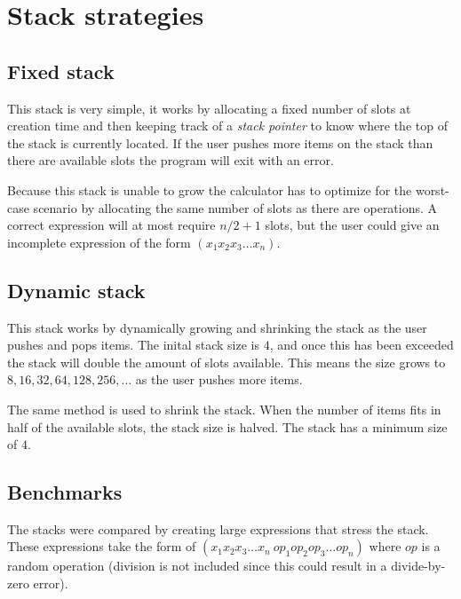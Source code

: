 \documentclass[a4paper,11pt]{article}
\begin{document}
\section*{Stack strategies}

\subsection*{Fixed stack}

This stack is very simple, it works by allocating a fixed number of slots at creation time and then keeping track of a \emph{stack pointer} to know where the top of the stack is currently located. If the user pushes more items on the stack than there are available slots the program will exit with an error.

Because this stack is unable to grow the calculator has to optimize for the worst-case scenario by allocating the same number of slots as there are operations. A correct expression will at most require $n/2 + 1$ slots, but the user could give an incomplete expression of the form $(x_1 x_2 x_3 \ldots x_n)$.

\subsection*{Dynamic stack}

This stack works by dynamically growing and shrinking the stack as the user pushes and pops items. The inital stack size is $4$, and once this has been exceeded the stack will double the amount of slots available. This means the size grows to $8, 16, 32, 64, 128, 256, \ldots$ as the user pushes more items.

The same method is used to shrink the stack. When the number of items fits in half of the available slots, the stack size is halved. The stack has a minimum size of $4$.

\subsection*{Benchmarks}

The stacks were compared by creating large expressions that stress the stack. These expressions take the form of $(x_1 x_2 x_3 \ldots x_n \ op_1 op_2 op_3 \ldots op_n)$ where $op$ is a random operation (division is not included since this could result in a divide-by-zero error).
\end{document}
